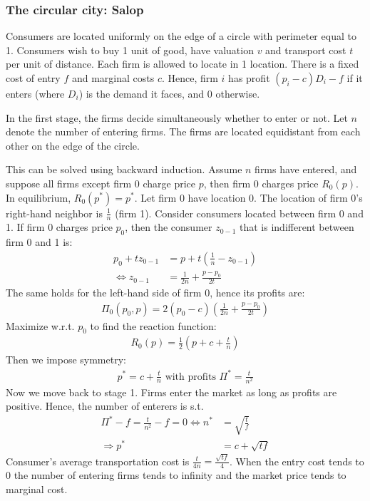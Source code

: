 \subsubsection{The circular city: Salop}
Consumers are located uniformly on the edge of a circle with perimeter equal to 1. Consumers wish to buy
1 unit of good, have valuation $v$ and transport cost $t$ per unit of distance. Each firm is
allowed to locate in 1 location. There is a fixed cost of entry $f$ and marginal costs $c$.
Hence, firm $i$ has profit $(p_i-c)D_i-f$ if it enters (where $D_i$) is the demand it faces, and
0 otherwise.

In the first stage, the firms decide simultaneously whether to enter or not. Let $n$ denote the
number of entering firms. The firms are located equidistant from each other on the edge of the
circle.

This can be solved using backward induction. Assume $n$ firms have entered, and suppose all
firms except firm 0 charge price $p$, then firm 0 charges price $R_0(p)$. In equilibrium,
$R_0(p^*)=p^*$. Let firm 0 have location 0. The location of firm 0's right-hand neighbor is
$\frac{1}{n}$ (firm 1). Consider consumers located between firm 0 and 1. If firm 0 charges
price $p_0$, then the consumer $z_{0-1}$ that is indifferent between firm 0 and 1 is:
\begin{align}
	p_0+tz_{0-1}                & =p+t\left(\frac{1}{n}-z_{0-1}\right) \\
	\Longleftrightarrow z_{0-1} & =\frac{1}{2n}+\frac{p-p_0}{2t}
\end{align}
The same holds for the left-hand side of firm 0, hence its profits are:
\begin{align}
	\Pi_0(p_0,p)=2(p_0-c)\left(\frac{1}{2n}+\frac{p-p_0}{2t}\right)
\end{align}
Maximize w.r.t. $p_0$ to find the reaction function:
\begin{align}
	R_0(p)=\frac{1}{2}\left(p+c+\frac{t}{n}\right)
\end{align}
Then we impose symmetry:
\begin{align}
	p^*=c+\frac{t}{n}\text{ with profits }\Pi^*=\frac{t}{n^2}
\end{align}
Now we move back to stage 1. Firms enter the market as long as profits are positive. Hence,
the number of enterers is s.t.
\begin{align}
	\Pi^*-f=\frac{t}{n^2}-f=0\Longleftrightarrow n^* & =\sqrt{\frac{t}{f}} \\
	\Longrightarrow p^*                              & =c+\sqrt{tf}
\end{align}
Consumer's average transportation cost is $\frac{t}{4n}=\frac{\sqrt{tf}}{4}$. When the entry
cost tends to 0 the number of entering firms tends to infinity and the market price tends
to marginal cost.

